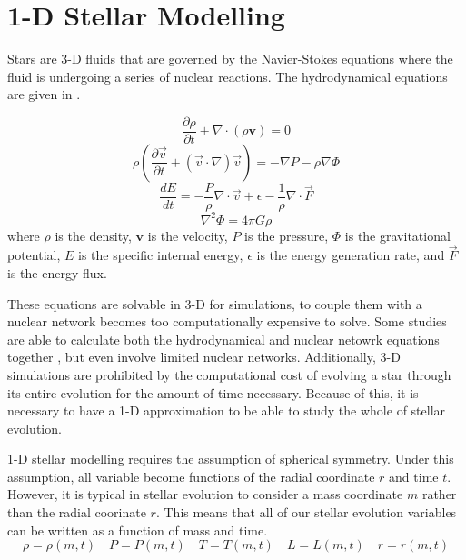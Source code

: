 \section{1-D Stellar Modelling}

Stars are 3-D fluids that are governed by the Navier-Stokes equations where the fluid is undergoing a series of nuclear reactions. 
The hydrodynamical equations are given in \cite{kippenhahnStellarStructureEvolution2013}.

\begin{equation}
\frac{\partial \rho}{\partial t} + \nabla \cdot (\rho \mathbf{v}) = 0
\label{eq:continuity}
\end{equation}
\begin{equation}
\rho \left( \frac{\partial \vec{v}}{\partial t} + (\vec{v} \cdot \nabla)\vec{v} \right) = -\nabla P - \rho \nabla \Phi
\label{eq:momentum}
\end{equation}
\begin{equation}
\frac{d E}{d t} = -\frac{P}{\rho} \nabla \cdot \vec{v} + \epsilon - \frac{1}{\rho} \nabla \cdot \vec{F}
\label{eq:energy}
\end{equation}
\begin{equation}
\nabla^2 \Phi = 4 \pi G \rho
\label{eq:poisson}
\end{equation}
where $\rho$ is the density, $\mathbf{v}$ is the velocity, $P$ is the pressure, $\Phi$ is the gravitational potential, $E$ is the specific internal energy, $\epsilon$ is the energy generation rate, and $\vec{F}$ is the energy flux.

These equations are solvable in 3-D for simulations, to couple them with a nuclear network becomes too computationally expensive to solve.
Some studies are able to calculate both the hydrodynamical and nuclear netowrk equations together \citep{rizzutiStellarEvolutionConvection2024}, but even involve limited nuclear networks.
Additionally, 3-D simulations are prohibited by the computational cost of evolving a star through its entire evolution for the amount of time necessary.
Because of this, it is necessary to have a 1-D approximation to be able to study the whole of stellar evolution.

1-D stellar modelling requires the assumption of spherical symmetry.
Under this assumption, all variable become functions of the radial coordinate $r$ and time $t$.
However, it is typical in stellar evolution to consider a mass coordinate $m$ rather than the radial coorinate $r$.
This means that all of our stellar evolution variables can be written as a function of mass and time.
\[
\rho = \rho(m,t) \quad P = P(m,t) \quad T = T(m,t) \quad L = L(m,t) \quad r = r(m,t)
\]

